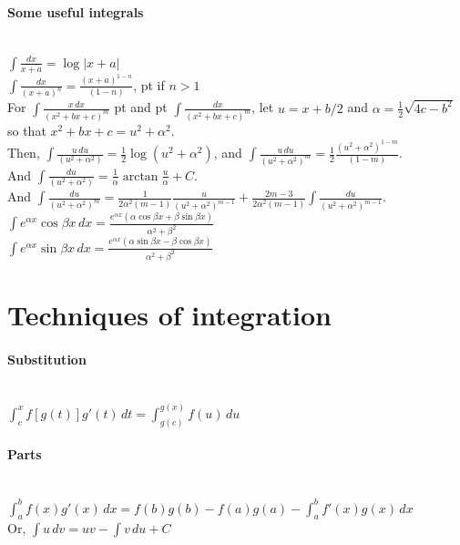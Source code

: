 \documentclass[10pt]{article}
\begin{document}
\paragraph{Some useful integrals}\ \\
$\int \frac{dx}{x+a} = \log |x+a|$\\
$\int \frac{dx}{(x+a)^n} = \frac{(x+a)^{1-n}}{(1-n)}$,  pt if $n > 1$\\
For $\int \frac{x\,dx}{(x^2 + bx + c)^m}$  pt and  pt $\int \frac{dx}{(x^2 + bx + c)^m}$,
let $u = x+ b/2$ and $\alpha = \frac{1}{2} \sqrt{4c -b^2}$ so that $x^2+bx+c = u^2+\alpha^2$.\\
Then, $\int \frac{u\,du}{(u^2+\alpha^2)} = \frac{1}{2} \log(u^2+\alpha^2)$,
and $\int \frac{u\,du}{(u^2+\alpha^2)^m} = \frac{1}{2}\frac{(u^2+\alpha^2)^{1-m}}{(1-m)}$.\\
And $\int \frac{du}{(u^2+\alpha^2)} = \frac{1}{\alpha} \arctan \frac{u}{\alpha} + C$.\\
And $\int \frac{du}{(u^2+\alpha^2)^m} =
\frac{1}{2\alpha^2(m-1)}\frac{u}{(u^2+\alpha^2)^{m-1}}+\frac{2m-3}{2\alpha^2(m-1)}\int \frac{du}{(u^2+\alpha^2)^{m-1}}$.\\
$\int e^{\alpha x}\cos \beta x\,dx = \frac{e^{\alpha x}(\alpha \cos \beta x + \beta \sin \beta x)}{\alpha^2+\beta^2}$\\
$\int e^{\alpha x}\sin \beta x\,dx = \frac{e^{\alpha x}(\alpha \sin \beta x - \beta \cos \beta x)}{\alpha^2+\beta^2}$



\bigskip\bigskip
\section{Techniques of integration}\smallskip

\paragraph{Substitution}\ \\
$\int_c^x f[g(t)]g'(t)\,dt = \int_{g(c)}^{g(x)}f(u)\,du$

\paragraph{Parts}\ \\
$\int_a^b f(x)g'(x)\,dx = f(b)g(b) - f(a)g(a) - \int_a^b f'(x)g(x)\,dx$\\
Or, $\int u\,dv = uv - \int v\,du + C$
\end{document}

